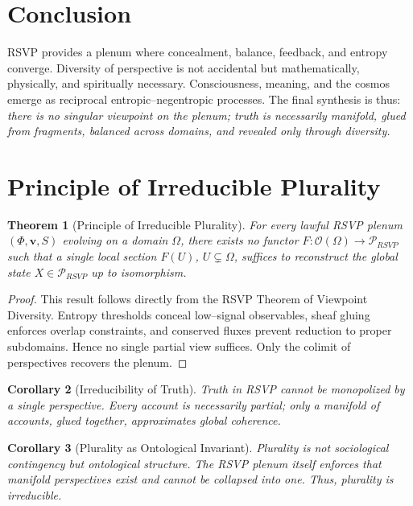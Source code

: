 \documentclass[a4paper,11pt,openany]{book}
\newtheorem{theorem}{Theorem}[section]
\newtheorem{corollary}[theorem]{Corollary}
\begin{document}
\section{Conclusion}
RSVP provides a plenum where concealment, balance, feedback, and entropy converge. 
Diversity of perspective is not accidental but mathematically, physically, and spiritually necessary. 
Consciousness, meaning, and the cosmos emerge as reciprocal entropic–negentropic processes. 
The final synthesis is thus: \emph{there is no singular viewpoint on the plenum; 
truth is necessarily manifold, glued from fragments, balanced across domains, 
and revealed only through diversity.} 

\section{Principle of Irreducible Plurality}

\begin{theorem}[Principle of Irreducible Plurality]
For every lawful RSVP plenum $(\Phi,\mathbf{v},S)$ evolving on a domain $\Omega$, 
there exists no functor $F : \mathcal{O}(\Omega) \to \mathcal{P}_{RSVP}$ such that 
a single local section $F(U)$, $U \subsetneq \Omega$, suffices to reconstruct the global state $X \in \mathcal{P}_{RSVP}$ up to isomorphism.
\end{theorem}

\begin{proof}
This result follows directly from the RSVP Theorem of Viewpoint Diversity. 
Entropy thresholds conceal low–signal observables, sheaf gluing enforces overlap constraints, 
and conserved fluxes prevent reduction to proper subdomains. 
Hence no single partial view suffices. Only the colimit of perspectives recovers the plenum.
\end{proof}

\begin{corollary}[Irreducibility of Truth]
Truth in RSVP cannot be monopolized by a single perspective. 
Every account is necessarily partial; only a manifold of accounts, glued together, 
approximates global coherence. 
\end{corollary}

\begin{corollary}[Plurality as Ontological Invariant]
Plurality is not sociological contingency but ontological structure. 
The RSVP plenum itself enforces that manifold perspectives exist and cannot be collapsed into one. 
Thus, plurality is irreducible.
\end{corollary}
\end{document}
